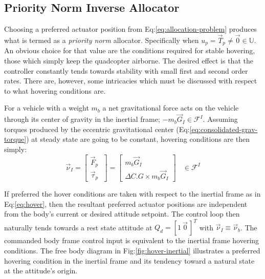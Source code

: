 \subsection{Priority Norm Inverse Allocator}
\label{subsec:allocation.allocators.norminverse}
Choosing a preferred actuator position from Eq:\ref{eq:allocation-problem} produces what is termed as a \emph{priority norm} allocator. Specifically when $u_p=\vec{T}_p\not=\vec{0}\in\mathbb{U}$. An obvious choice for that value are the conditions required for stable hovering, those which simply keep the quadcopter airborne. The desired effect is that the controller constantly tends towards stability with small first and second order rates. There are, however, some intricacies which must be discussed with respect to what hovering conditions are.
\par
For a vehicle with a weight $m_b$ a net gravitational force acts on the vehicle through its center of gravity in the inertial frame; $-m_b\vec{G}_I\in\mathcal{F}^I$. Assuming torques produced by the eccentric gravitational center (Eq:\ref{eq:consolidated-grav-torque}) at steady state are going to be constant, hovering conditions are then simply:
\begin{equation}\label{eq:hover}
\vec{\nu}_I=
\begin{bmatrix}
\vec{F}_p\hspace{3pt}\\
\vec{\tau}_p\hspace{3pt}
\end{bmatrix}
=
\begin{bmatrix}
m_b\vec{G}_I\hspace{3pt}\\
\Delta C.G \times m_b\vec{G}_I
\end{bmatrix}~~~~\in\mathcal{F}^I
\end{equation}
\par
If preferred the hover conditions are taken with respect to the inertial frame as in Eq:\ref{eq:hover}, then the resultant preferred actuator positions are independent from the body's current or desired attitude setpoint. The control loop then naturally tends towards a rest state attitude at $Q_d=[1~\vec{0}\hspace{2pt}]^T$ with $\vec{\nu}_I\equiv\vec{\nu}_b$. The commanded body frame control input is equivalent to the inertial frame hovering conditions. The free body diagram in Fig:\ref{fig:hover-inertial} illustrates a preferred hovering condition in the inertial frame and its tendency toward a natural state at the attitude's origin.
